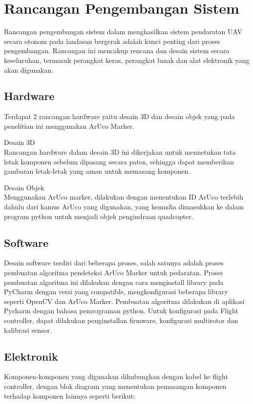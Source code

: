 \section{Rancangan Pengembangan Sistem}
Rancangan pengembangan sistem dalam menghasilkan sistem pendaratan UAV secara otonom pada landasan bergerak adalah kunci penting dari proses pengembangan. Rancangan ini mencakup rencana dan desain sistem secara keseluruhan, termasuk perangkat keras, perangkat lunak dan alat elektronik yang akan digunakan.

\subsection{Hardware}
Terdapat 2 rancangan hardware yaitu desain 3D dan desain objek yang pada penelitian ini menggunakan ArUco Marker.
\begin{packed_enum}
	\item Desain 3D
	\\ Rancangan hardware dalam desain 3D ini dikerjakan untuk mennetukan tata letak komponen sebelum dipasang secara paten, sehingga dapat memberikan gambaran letak-letak yang aman untuk memasang komponen.
	\item Desain Objek
	\\ Menggunakan ArUco marker, dilakukan dengan menentukan ID ArUco terlebih dahulu dari kamus ArUco yang digunakan, yang kemudia dimasukkan ke dalam program python untuk menjadi objek pengindraan quadcopter.
\end{packed_enum}

\subsection{Software}
Desain software terdiri dari beberapa proses, salah satunya adalah proses pembuatan algoritma pendeteksi ArUco Marker untuk pedaratan.  Proses pembuatan algoritma ini dilakukan dengan cara menginstall library pada PyCharm dengan versi yang compatible, mengkonfigurasi beberapa library seperti OpenCV dan ArUco Marker. Pembuatan algoritma dilakukan di aplikasi Pycharm dengan bahasa pemrograman python. Untuk konfigurasi pada Flight controller, dapat dilakukan penginstallan firmware, konfigurasi multirotor dan kalibrasi sensor. 

\subsection{Elektronik}
Komponen-komponen yang digunakan dihubungkan dengan kabel ke flight controller, dengan blok diagram yang menentukan pemasangan komponen terhadap komponen lainnya seperti berikut:

